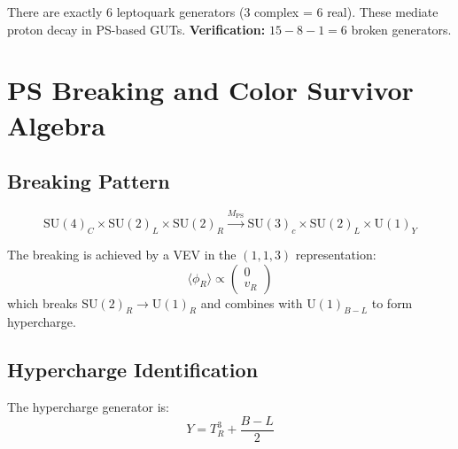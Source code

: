 \documentclass[11pt,a4paper]{article}
\theoremstyle{definition}
\begin{document}
\begin{trapbox}
There are exactly 6 leptoquark generators (3 complex = 6 real).
These mediate proton decay in PS-based GUTs.
\textbf{Verification:} $15 - 8 - 1 = 6$ broken generators. \checkmark
\end{trapbox}

\newpage

\section{PS Breaking and Color Survivor Algebra}
\label{sec:ps-breaking}

\subsection{Breaking Pattern}
\label{subsec:breaking-pattern}

\begin{canonbox}
\begin{equation}
  \label{eq:ps-breaking}
  \text{SU}(4)_C \times \text{SU}(2)_L \times \text{SU}(2)_R
  \xrightarrow{M_{\text{PS}}}
  \text{SU}(3)_c \times \text{SU}(2)_L \times \text{U}(1)_Y
\end{equation}
\end{canonbox}

The breaking is achieved by a VEV in the $(1, 1, 3)$ representation:
\begin{equation}
  \label{eq:ps-vev}
  \langle \phi_R \rangle \propto \begin{pmatrix} 0 \\ v_R \end{pmatrix}
\end{equation}
which breaks $\text{SU}(2)_R \to \text{U}(1)_R$ and combines with $\text{U}(1)_{B-L}$
to form hypercharge.

\subsection{Hypercharge Identification}
\label{subsec:hypercharge}

The hypercharge generator is:
\begin{equation}
  \label{eq:hypercharge-def}
  Y = T_R^3 + \frac{B - L}{2}
\end{equation}
\end{document}
